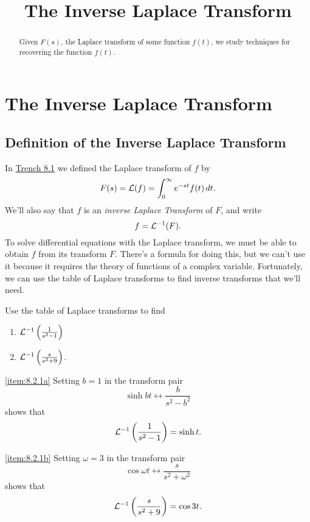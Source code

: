 \documentclass{ximera}
\title{The Inverse Laplace Transform}%
\begin{document}
\begin{abstract}
Given $F(s)$, the Laplace transform of some function $f(t)$, we study techniques for recovering the function $f(t)$.
\end{abstract}

\maketitle

\section*{The Inverse Laplace Transform}

\subsection*{Definition of the Inverse Laplace Transform}

In \href{https://xerxes.ximera.org/differentialequations/main/introToLaplace/introToLaplace}{Trench 8.1} we defined the Laplace transform
of
$f$ by
$$
F(s)={\cal L}(f)=\int_0^\infty e^{-st}f(t)\,dt.
$$
We'll also say that $f$ is an \textit{inverse Laplace Transform} of
$F$, and write
$$
f={\cal L}^{-1}(F).
$$
To solve differential equations with the Laplace transform, we
must be able to obtain $f$ from its transform $F$. There's a formula
for doing this, but we can't use it because it requires the theory of
functions of a complex variable. Fortunately, we can use the table of
Laplace transforms to find inverse transforms that we'll need.

\begin{example}\label{example:8.2.1}
Use the table of Laplace transforms to find
\begin{enumerate}
    
    \item\label{item:8.2.1a} ${\cal L}^{-1}\left(\frac{1}{s^2-1}\right)$
    \item\label{item:8.2.1b} ${\cal L}^{-1}\left(\frac{s}{s^2+9}\right)$. 
\end{enumerate}
\begin{explanation}
\ref{item:8.2.1a}
Setting $b=1$ in  the transform pair
$$
\sinh bt\leftrightarrow \frac{b}{s^2-b^2}
$$
shows that
$$
{\cal L}^{-1}\left(\frac{1}{s^2-1}\right)=\sinh t.
$$

\ref{item:8.2.1b}
Setting $\omega=3$ in  the transform pair
$$
\cos\omega t\leftrightarrow\frac{s}{s^2+\omega^2}
$$
shows that
$$
{\cal L}^{-1}\left(\frac{s}{s^2+9}\right)=\cos3t.
$$
\end{explanation}
\end{example}
\end{document}

